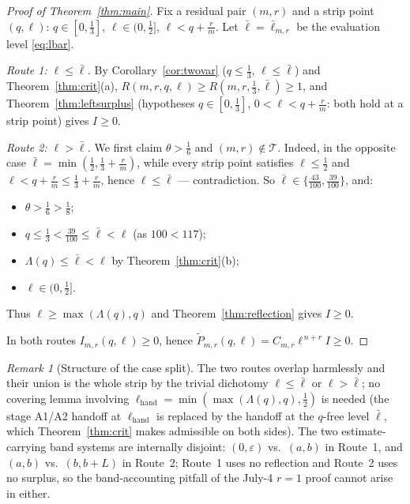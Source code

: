 \documentclass[11pt]{amsart}
\theoremstyle{remark}
\newtheorem{remark}[theorem]{Remark}
\newcommand{\wtP}{\widetilde P}
\newcommand{\lbar}{\bar\ell}
\begin{document}
\begin{proof}[Proof of Theorem~\ref{thm:main}]
Fix a residual pair $(m,r)$ and a strip point $(q,\ell)$: $q\in[0,\tfrac13]$, $\ell\in(0,\tfrac12]$, $\ell<q+\tfrac rm$.  Let $\lbar=\lbar_{m,r}$ be the evaluation level \eqref{eq:lbar}.

\emph{Route 1: $\ell\le\lbar$.}  By Corollary~\ref{cor:twovar} ($q\le\tfrac13$, $\ell\le\lbar$) and Theorem~\ref{thm:crit}(a),
$R(m,r,q,\ell)\ge R(m,r,\tfrac13,\lbar)\ge1$,
and Theorem~\ref{thm:leftsurplus} (hypotheses $q\in[0,\tfrac13]$, $0<\ell<q+\tfrac rm$: both hold at a strip point) gives $I\ge0$.

\emph{Route 2: $\ell>\lbar$.}  We first claim $\theta>\tfrac16$ and $(m,r)\notin\mathcal T$.  Indeed, in the opposite case $\lbar=\min(\tfrac12,\tfrac13+\tfrac rm)$, while every strip point satisfies $\ell\le\tfrac12$ and $\ell<q+\tfrac rm\le\tfrac13+\tfrac rm$, hence $\ell\le\lbar$ --- contradiction.  So $\lbar\in\{\tfrac{43}{100},\tfrac{39}{100}\}$, and:
\begin{itemize}
\item $\theta>\tfrac16>\tfrac18$;
\item $q\le\tfrac13<\tfrac{39}{100}\le\lbar<\ell$ (as $100<117$);
\item $\Lambda(q)\le\lbar<\ell$ by Theorem~\ref{thm:crit}(b);
\item $\ell\in(0,\tfrac12]$.
\end{itemize}
Thus $\ell\ge\max(\Lambda(q),q)$ and Theorem~\ref{thm:reflection} gives $I\ge0$.

In both routes $I_{m,r}(q,\ell)\ge0$, hence $\wtP_{m,r}(q,\ell)=C_{m,r}\ell^{\,n+r}I\ge0$.
\end{proof}

\begin{remark}[Structure of the case split]\label{rmk:structure}
The two routes overlap harmlessly and their union is the whole strip by the trivial dichotomy $\ell\le\lbar$ or $\ell>\lbar$; no covering lemma involving $\ell_{\mathrm{hand}}=\min(\max(\Lambda(q),q),\tfrac12)$ is needed (the stage A1/A2 handoff at $\ell_{\mathrm{hand}}$ is replaced by the handoff at the $q$-free level $\lbar$, which Theorem~\ref{thm:crit} makes admissible on both sides).  The two estimate-carrying band systems are internally disjoint: $(0,\varepsilon)$ vs.\ $(a,b)$ in Route~1, and $(a,b)$ vs.\ $(b,b+L)$ in Route~2; Route~1 uses no reflection and Route~2 uses no surplus, so the band-accounting pitfall of the July-4 $r=1$ proof cannot arise in either.
\end{remark}
\end{document}
